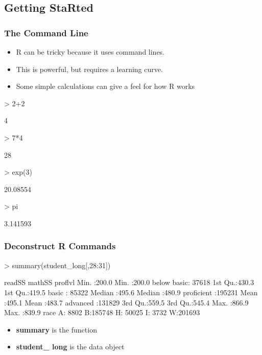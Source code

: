 \documentclass[12pt,handout]{beamer}
\begin{document}
\subsection{Getting StaRted}
\label{sec: start}

\begin{frame}[containsverbatim]
\frametitle{The Command Line}
\begin{itemize}
\item R can be tricky because it uses command lines.
\item This is powerful, but requires a learning curve.
\item Some simple calculations can give a feel for how R works
\end{itemize}
\begin{Schunk}
\begin{Sinput}
> 2+2
\end{Sinput}
\begin{Soutput}
[1] 4
\end{Soutput}
\begin{Sinput}
> 7*4
\end{Sinput}
\begin{Soutput}
[1] 28
\end{Soutput}
\begin{Sinput}
> exp(3)
\end{Sinput}
\begin{Soutput}
[1] 20.08554
\end{Soutput}
\begin{Sinput}
> pi
\end{Sinput}
\begin{Soutput}
[1] 3.141593
\end{Soutput}
\end{Schunk}
\end{frame}

\begin{frame}[containsverbatim]
\frametitle{Deconstruct R Commands}
\begin{Schunk}
\begin{Sinput}
> summary(student_long[,28:31])
\end{Sinput}
\begin{Soutput}
     readSS          mathSS             proflvl      
 Min.   :200.0   Min.   :200.0   below basic: 37618  
 1st Qu.:430.3   1st Qu.:419.5   basic      : 85322  
 Median :495.6   Median :480.9   proficient :195231  
 Mean   :495.1   Mean   :483.7   advanced   :131829  
 3rd Qu.:559.5   3rd Qu.:545.4                       
 Max.   :866.9   Max.   :839.9                       
 race      
 A:  8802  
 B:185748  
 H: 50025  
 I:  3732  
 W:201693  
\end{Soutput}
\end{Schunk}
\begin{itemize}
  \item \textbf{summary} is the function
  \item \textbf{student\_ long} is the data object
\end{itemize}
\end{frame}
\end{document}
